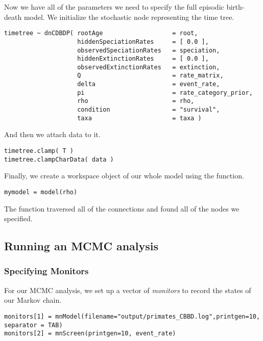 Now we have all of the parameters we need to specify the full episodic birth-death model. 
We initialize the stochastic node representing the time tree.
{\tt \begin{snugshade*}
\begin{lstlisting}
timetree ~ dnCDBDP( rootAge                   = root,
                    hiddenSpeciationRates     = [ 0.0 ],
                    observedSpeciationRates   = speciation,
                    hiddenExtinctionRates     = [ 0.0 ],
                    observedExtinctionRates   = extinction, 
                    Q                         = rate_matrix,
                    delta                     = event_rate,
                    pi                        = rate_category_prior,
                    rho                       = rho,
                    condition                 = "survival",
                    taxa                      = taxa )
\end{lstlisting}
\end{snugshade*}}
And then we attach data to it.
{\tt \begin{snugshade*}
\begin{lstlisting}
timetree.clamp( T )
timetree.clampCharData( data )
\end{lstlisting}
\end{snugshade*}}

Finally, we create a workspace object of our whole model using the  function. 
{\tt \begin{snugshade*}
\begin{lstlisting}
mymodel = model(rho)
\end{lstlisting}
\end{snugshade*}}

The  function traversed all of the connections and found all of the nodes we specified. 


\subsection{Running an MCMC analysis}

\subsubsection{Specifying Monitors}

For our MCMC analysis, we set up a vector of \emph{monitors} to record the states of our Markov chain. 
{\tt \begin{snugshade*}
\begin{lstlisting}
monitors[1] = mnModel(filename="output/primates_CBBD.log",printgen=10, separator = TAB)
monitors[2] = mnScreen(printgen=10, event_rate)
\end{lstlisting}
\end{snugshade*}}

